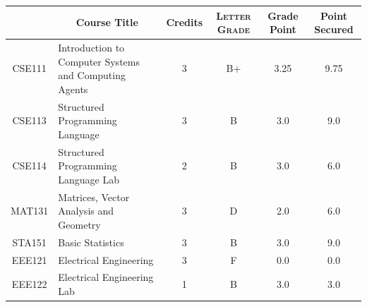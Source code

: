 \documentclass[11pt]{article}
\newcommand*{\numtwo}[1]{\pgfmathprintnumber[
                    fixed, precision=2, fixed zerofill=true]{#1}}
\begin{document}
                \begin{center}
                    \renewcommand{\arraystretch}{1.08}
                    
                \begin{tabular}{|c|l|c|>{\scshape}c|c|c|}
                \hline  \rule[-1ex]{0pt}{3.5ex} {\centering{\bf Course Code}} &  \multicolumn{1}{c|}{\textbf{Course Title}}  & {\bf Credits} & {\bf Letter Grade} & {\bf Grade Point} & {\bf Point Secured}  \\ 
                \hline   CSE111 &  Introduction to Computer Systems and Computing Agents		 & 3 & B+ & 3.25 & 9.75 \\ %
                \hline   CSE113 &  Structured Programming Language		 & 3 & B & 3.0 & 9.0 \\ %
                \hline   CSE114 &  Structured Programming Language Lab		 & 2 & B & 3.0 & 6.0 \\ %
                \hline   MAT131 &  Matrices, Vector Analysis and Geometry		 & 3 & D & 2.0 & 6.0 \\ %
                \hline   STA151 &  Basic Statistics		 & 3 & B & 3.0 & 9.0 \\ %
                \hline   EEE121 &  Electrical Engineering		 & 3 & F & 0.0 & 0.0 \\ %
                \hline   EEE122 &  Electrical Engineering Lab		 & 1 & B & 3.0 & 3.0 \\ %

\hline                %
                \end{tabular}
                \end{center}
                \renewcommand{\arraystretch}{1.03}
\end{document}
